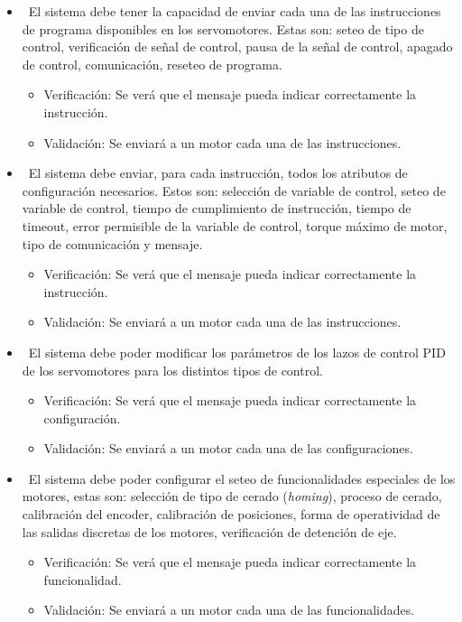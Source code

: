 \documentclass[
11pt, %
]{charter}
\begin{document}
\begin{itemize}
\begin{itemize}
	\end{itemize}
	\item \REQ ~El sistema debe tener la capacidad de enviar cada una de las instrucciones de programa disponibles en los servomotores. Estas son: seteo de tipo de control, verificación de señal de control, pausa de la señal de control, apagado de control, comunicación, reseteo de programa.
	\begin{itemize}
		\item Verificación: Se verá que el mensaje pueda indicar correctamente la instrucción.
		\item Validación: Se enviará a un motor cada una de las instrucciones.
	\end{itemize}
	\item \REQ ~El sistema debe enviar, para cada instrucción, todos los atributos de configuración necesarios. Estos son: selección de variable de control, seteo de variable de control, tiempo de cumplimiento de instrucción, tiempo de timeout, error permisible de la variable de control, torque máximo de motor, tipo de comunicación y mensaje.
	\begin{itemize}
		\item Verificación: Se verá que el mensaje pueda indicar correctamente la instrucción.
		\item Validación: Se enviará a un motor cada una de las instrucciones.
	\end{itemize}
	\item \REQ ~El sistema debe poder modificar los parámetros de los lazos de control PID de los servomotores para los distintos tipos de control.
	\begin{itemize}
		\item Verificación: Se verá que el mensaje pueda indicar correctamente la configuración.
		\item Validación: Se enviará a un motor cada una de las configuraciones.
	\end{itemize}
	\item \REQ ~El sistema debe poder configurar el seteo de funcionalidades especiales de los motores, estas son: selección de tipo de cerado (\textit{homing}), proceso de cerado, calibración del encoder, calibración de posiciones, forma de operatividad de las salidas discretas de los motores, verificación de detención de eje.
	\begin{itemize}
		\item Verificación: Se verá que el mensaje pueda indicar correctamente la funcionalidad.
		\item Validación: Se enviará a un motor cada una de las funcionalidades.

\end{itemize}
\end{itemize}
\end{document}
